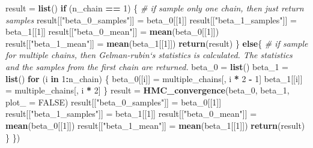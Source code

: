\documentclass[
]{article}
\newenvironment{Shaded}{\begin{snugshade}}{\end{snugshade}}
\newcommand{\CommentTok}[1]{\textcolor[rgb]{0.56,0.35,0.01}{\textit{#1}}}
\newcommand{\ControlFlowTok}[1]{\textcolor[rgb]{0.13,0.29,0.53}{\textbf{#1}}}
\newcommand{\DataTypeTok}[1]{\textcolor[rgb]{0.13,0.29,0.53}{#1}}
\newcommand{\DecValTok}[1]{\textcolor[rgb]{0.00,0.00,0.81}{#1}}
\newcommand{\KeywordTok}[1]{\textcolor[rgb]{0.13,0.29,0.53}{\textbf{#1}}}
\newcommand{\NormalTok}[1]{#1}
\newcommand{\OperatorTok}[1]{\textcolor[rgb]{0.81,0.36,0.00}{\textbf{#1}}}
\newcommand{\OtherTok}[1]{\textcolor[rgb]{0.56,0.35,0.01}{#1}}
\newcommand{\StringTok}[1]{\textcolor[rgb]{0.31,0.60,0.02}{#1}}
\begin{document}
\begin{Shaded}
\begin{Highlighting}[]
{\NormalTok{    result =}\StringTok{ }\KeywordTok{list}\NormalTok{()}
    \ControlFlowTok{if}\NormalTok{ (n_chain }\OperatorTok{==}\StringTok{ }\DecValTok{1}\NormalTok{) \{}
      \CommentTok{# if sample only one chain, then just return samples}
\NormalTok{      result[[}\StringTok{"beta_0_samples"}\NormalTok{]] =}\StringTok{ }\NormalTok{beta_}\DecValTok{0}\NormalTok{[[}\DecValTok{1}\NormalTok{]]}
\NormalTok{      result[[}\StringTok{"beta_1_samples"}\NormalTok{]] =}\StringTok{ }\NormalTok{beta_}\DecValTok{1}\NormalTok{[[}\DecValTok{1}\NormalTok{]]}
\NormalTok{      result[[}\StringTok{"beta_0_mean"}\NormalTok{]] =}\StringTok{ }\KeywordTok{mean}\NormalTok{(beta_}\DecValTok{0}\NormalTok{[[}\DecValTok{1}\NormalTok{]])}
\NormalTok{      result[[}\StringTok{"beta_1_mean"}\NormalTok{]] =}\StringTok{ }\KeywordTok{mean}\NormalTok{(beta_}\DecValTok{1}\NormalTok{[[}\DecValTok{1}\NormalTok{]])}
      \KeywordTok{return}\NormalTok{(result)}
\NormalTok{    \}}
    \ControlFlowTok{else}\NormalTok{\{}
      \CommentTok{# if sample for multiple chains, then Gelman-rubin`s statistics is calculated. The statistics and the samples from the first chain are returned.}
\NormalTok{      beta_}\DecValTok{0}\NormalTok{ =}\StringTok{ }\KeywordTok{list}\NormalTok{()}
\NormalTok{      beta_}\DecValTok{1}\NormalTok{ =}\StringTok{ }\KeywordTok{list}\NormalTok{()}
      \ControlFlowTok{for}\NormalTok{ (i }\ControlFlowTok{in} \DecValTok{1}\OperatorTok{:}\NormalTok{n_chain) \{}
\NormalTok{        beta_}\DecValTok{0}\NormalTok{[[i]] =}\StringTok{ }\NormalTok{multiple_chains[, i }\OperatorTok{*}\StringTok{ }\DecValTok{2} \OperatorTok{-}\StringTok{ }\DecValTok{1}\NormalTok{]}
\NormalTok{        beta_}\DecValTok{1}\NormalTok{[[i]] =}\StringTok{ }\NormalTok{multiple_chains[, i }\OperatorTok{*}\StringTok{ }\DecValTok{2}\NormalTok{]}
\NormalTok{      \}}
\NormalTok{      result =}\StringTok{ }\KeywordTok{HMC_convergence}\NormalTok{(beta_}\DecValTok{0}\NormalTok{, beta_}\DecValTok{1}\NormalTok{, }\DataTypeTok{plot_ =} \OtherTok{FALSE}\NormalTok{)}
\NormalTok{      result[[}\StringTok{"beta_0_samples"}\NormalTok{]] =}\StringTok{ }\NormalTok{beta_}\DecValTok{0}\NormalTok{[[}\DecValTok{1}\NormalTok{]]}
\NormalTok{      result[[}\StringTok{"beta_1_samples"}\NormalTok{]] =}\StringTok{ }\NormalTok{beta_}\DecValTok{1}\NormalTok{[[}\DecValTok{1}\NormalTok{]]}
\NormalTok{      result[[}\StringTok{"beta_0_mean"}\NormalTok{]] =}\StringTok{ }\KeywordTok{mean}\NormalTok{(beta_}\DecValTok{0}\NormalTok{[[}\DecValTok{1}\NormalTok{]])}
\NormalTok{      result[[}\StringTok{"beta_1_mean"}\NormalTok{]] =}\StringTok{ }\KeywordTok{mean}\NormalTok{(beta_}\DecValTok{1}\NormalTok{[[}\DecValTok{1}\NormalTok{]])}
      \KeywordTok{return}\NormalTok{(result)}
\NormalTok{    \}}
\NormalTok{  \})}
  
}
\end{Highlighting}
\end{Shaded}
\end{document}
